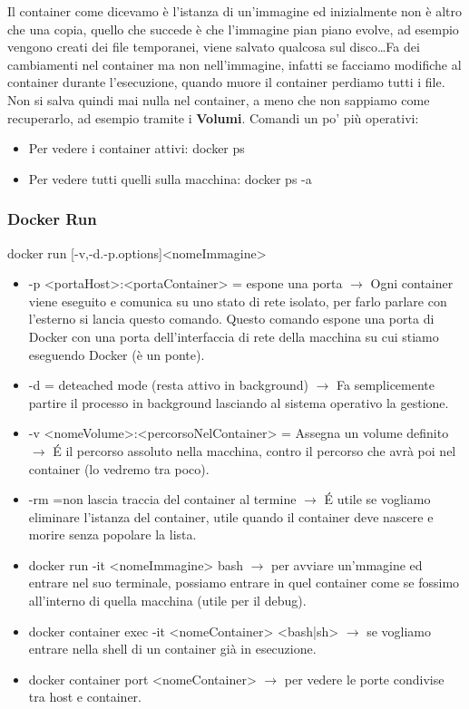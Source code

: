 \documentclass[a4paper,12pt]{article}
\begin{document}
Il container come dicevamo è l'istanza di un'immagine ed inizialmente non è altro che una copia, quello che succede è che l'immagine pian piano evolve, ad esempio vengono creati dei file temporanei,
viene salvato qualcosa sul disco\dots Fa dei cambiamenti nel container ma non nell'immagine, infatti se facciamo modifiche al container durante l'esecuzione, quando muore il container perdiamo tutti i file. 
Non si salva quindi mai nulla nel container, a meno che non sappiamo come recuperarlo, ad esempio tramite i \textbf{Volumi}. 
\newline
Comandi un po' più operativi:
\begin{itemize}
    \item Per vedere i container attivi: docker ps 
    \item Per vedere tutti quelli sulla macchina: docker ps -a
\end{itemize}
\subsubsection{Docker Run}
docker run [-v,-d.-p.options]<nomeImmagine>
\begin{itemize}
    \item -p <portaHost>:<portaContainer> = espone una porta $\rightarrow$ Ogni container viene eseguito e comunica su uno stato di rete isolato, per farlo parlare con l'esterno si lancia questo comando. Questo comando espone una porta di Docker con una porta dell'interfaccia di rete della macchina su cui stiamo eseguendo Docker (è un ponte).
    \item -d = deteached mode (resta attivo in background) $\rightarrow$ Fa semplicemente partire il processo in background lasciando al sistema operativo la gestione.
    \item -v <nomeVolume>:<percorsoNelContainer> = Assegna un volume definito $\rightarrow$ \'{E} il percorso assoluto nella macchina, contro il percorso che avrà poi nel container (lo vedremo tra poco).
    \item -rm =non lascia traccia del container al termine $\rightarrow$ \'{E} utile se vogliamo eliminare l'istanza del container, utile quando il container deve nascere e morire senza popolare la lista.
    \item docker run -it <nomeImmagine> bash $\rightarrow$ per avviare un'mmagine ed entrare nel suo terminale, possiamo entrare in quel container come se fossimo all'interno di quella macchina (utile per il debug).
    \item docker container exec -it <nomeContainer> <bash|sh> $\rightarrow$ se vogliamo entrare nella shell di un container già in esecuzione.
    \item docker container port <nomeContainer> $\rightarrow$ per vedere le porte condivise tra host e container.
\end{itemize}
\end{document}
